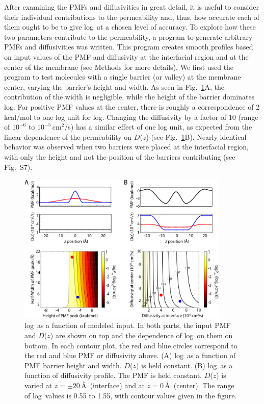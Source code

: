   \par After examining the PMFs and diffusivities in great detail, it is useful to consider their individual contributions to the permeability and, thus, how accurate each of them ought to be to give log\perm~at a chosen level of accuracy.  To explore how these two parameters contribute to the permeability, a program to generate arbitrary PMFs and diffusivities was written.  This program creates smooth profiles based on input values of the PMF and diffusivity at the interfacial region and at the center of the membrane (see Methods for more details).  We first used the program to test molecules with a single barrier (or valley) at the membrane center, varying the barrier's height and width.  As seen in Fig.~\ref{fig:models}A, the contribution of the width is negligible, while the height of the barrier dominates log\perm.  For positive PMF values 
 at the center, there is roughly a correspondence of 2\,kcal/mol to one log unit for log\perm.  Changing the diffusivity by a factor of 10 (range of $10^{-6}$ to $10^{-5}$\,cm$^2$/s) has a similar effect of one log unit, as expected from the linear dependence of the permeability on $D$($z$) (see Fig.~\ref{fig:models}B).  Nearly identical behavior was observed when two barriers were placed at the interfacial region, with only the height and not the position of the barriers contributing (see Fig.~S7).

\begin{figure}[htbp]
\begin{center}
	\includegraphics[width=0.9\textwidth]{Figures/models}
	\caption{log\perm~as a function of modeled input.  In both parts, the input PMF and $D$($z$) are shown on top and the dependence of log\perm~on them on bottom.  In each contour plot, the red and blue circles correspond to the red and blue PMF or diffusivity above.  (A) log\perm~as a function of PMF barrier height and width.  $D$($z$) is held constant.  (B) log\perm~as a function of diffusivity profile.  The PMF is held constant.  $D$($z$) is varied at $z=\pm 20$\,\AA~(interface) and at $z=0$\,\AA~(center).  The range of log\perm~values is 0.55 to 1.55, with contour values given in the figure.}
	\label{fig:models}
\end{center}
\end{figure}

